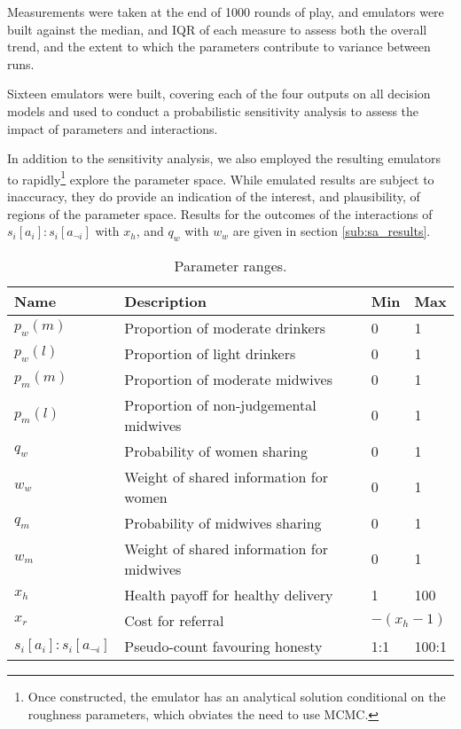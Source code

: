 Measurements were taken at the end of 1000 rounds of play, and emulators were built against the median, and \ac{IQR} of each measure to assess both the overall trend, and the extent to which the parameters contribute to variance between runs.

Sixteen emulators were built, covering each of the four outputs on all decision models and used to conduct a probabilistic sensitivity analysis to assess the impact of parameters and interactions.

In addition to the sensitivity analysis, we also employed the resulting emulators to rapidly\footnote{Once constructed, the emulator has an analytical solution conditional on the roughness parameters, which obviates the need to use MCMC.} explore the parameter space. While emulated results are subject to inaccuracy, they do provide an indication of the interest, and plausibility, of regions of the parameter space. Results for the outcomes of the interactions of \(s_{i}[a_{i}]:s_{i}[a_{\neg i}]\) with \(x_{h}\), and \(q_{w}\) with \(w_{w}\) are given in section \ref{sub:sa_results}.

\begin{table}
\center
\begin{tabular} {|l | l | l| l|}
\hline
Name & Description & Min & Max \\ \hline
\(p_{w}(m)\) & Proportion of moderate drinkers & 0 & 1 \\ \hline
\(p_{w}(l)\) & Proportion of light drinkers & 0 & 1 \\ \hline
\(p_{m}(m)\) & Proportion of moderate midwives & 0 & 1 \\ \hline
\(p_{m}(l)\) & Proportion of non-judgemental midwives & 0 & 1 \\ \hline
\(q_{w}\) & Probability of women sharing & 0 & 1 \\ \hline
\(w_{w}\) & Weight of shared information for women & 0 & 1 \\ \hline
\(q_{m}\) & Probability of midwives sharing & 0 & 1 \\ \hline
\(w_{m}\) & Weight of shared information for midwives & 0 & 1 \\ \hline
\(x_{h}\) & Health payoff for healthy delivery & 1 & 100 \\ \hline
\(x_{r}\) & Cost for referral & \multicolumn{2}{l|}{\(-(x_{h} - 1)\)} \\ \hline
\(s_{i}[a_{i}]:s_{i}[a_{\neg i}]\) & Pseudo-count favouring honesty & 1:1 & 100:1 \\ \hline
\end{tabular}
\caption{Parameter ranges. \label{tab:sa_params}}
\end{table}